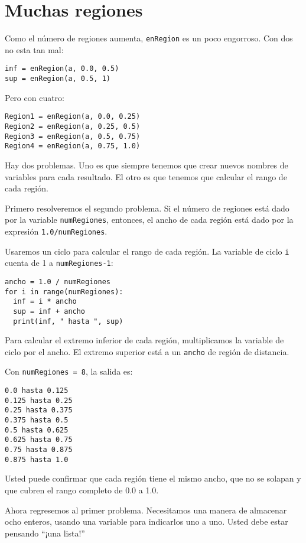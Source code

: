 \section{Muchas regiones}

\label{muchasregiones}

Como el número de regiones aumenta, \texttt{enRegion} es un poco engorroso.
Con dos no esta tan mal:
\begin{lstlisting}
inf = enRegion(a, 0.0, 0.5)
sup = enRegion(a, 0.5, 1)
\end{lstlisting}
 Pero con cuatro:
\begin{lstlisting}
Region1 = enRegion(a, 0.0, 0.25)
Region2 = enRegion(a, 0.25, 0.5)
Region3 = enRegion(a, 0.5, 0.75)
Region4 = enRegion(a, 0.75, 1.0)
\end{lstlisting}
Hay dos problemas. Uno es que siempre tenemos que crear nuevos nombres
de variables para cada resultado. El otro es que tenemos que calcular
el rango de cada región.

Primero resolveremos el segundo problema. Si el número de regiones
está dado por la variable \texttt{numRegiones}, entonces, el ancho
de cada región está dado por la expresión \texttt{1.0/numRegiones}.

Usaremos un ciclo para calcular el rango de cada región. La variable
de ciclo \texttt{i} cuenta de 1 a \texttt{numRegiones-1}:
\begin{lstlisting}
ancho = 1.0 / numRegiones
for i in range(numRegiones):
  inf = i * ancho
  sup = inf + ancho
  print(inf, " hasta ", sup)
\end{lstlisting}
Para calcular el extremo inferior de cada región, multiplicamos la
variable de ciclo por el ancho. El extremo superior está a un \texttt{ancho}
de región de distancia.

Con \texttt{numRegiones = 8}, la salida es:
\begin{verbatim}
0.0 hasta 0.125
0.125 hasta 0.25
0.25 hasta 0.375
0.375 hasta 0.5
0.5 hasta 0.625
0.625 hasta 0.75
0.75 hasta 0.875
0.875 hasta 1.0
\end{verbatim}
Usted puede confirmar que cada región tiene el mismo ancho, que no
se solapan y que cubren el rango completo de 0.0 a 1.0.

Ahora regresemos al primer problema. Necesitamos una manera de almacenar
ocho enteros, usando una variable para indicarlos uno a uno. Usted
debe estar pensando ``¡una lista!''

